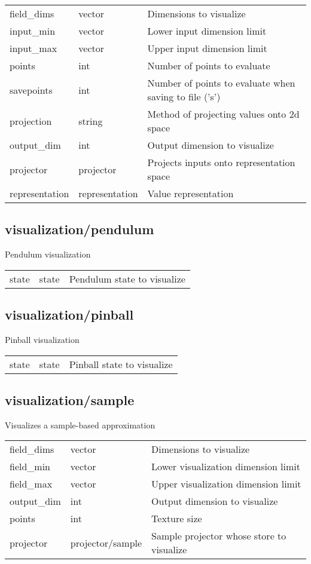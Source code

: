 \noindent\begin{tabular}{@{}lll@{}}
field\_dims&vector&Dimensions to visualize\\
input\_min&vector&Lower input dimension limit\\
input\_max&vector&Upper input dimension limit\\
points&int&Number of points to evaluate\\
savepoints&int&Number of points to evaluate when saving to file ('s')\\
projection&string&Method of projecting values onto 2d space\\
output\_dim&int&Output dimension to visualize\\
projector&projector&Projects inputs onto representation space\\
representation&representation&Value representation\\
\end{tabular}
\subsection{visualization/pendulum}
\noindent Pendulum visualization\\

\noindent\begin{tabular}{@{}lll@{}}
state&state&Pendulum state to visualize\\
\end{tabular}
\subsection{visualization/pinball}
\noindent Pinball visualization\\

\noindent\begin{tabular}{@{}lll@{}}
state&state&Pinball state to visualize\\
\end{tabular}
\subsection{visualization/sample}
\noindent Visualizes a sample-based approximation\\

\noindent\begin{tabular}{@{}lll@{}}
field\_dims&vector&Dimensions to visualize\\
field\_min&vector&Lower visualization dimension limit\\
field\_max&vector&Upper visualization dimension limit\\
output\_dim&int&Output dimension to visualize\\
points&int&Texture size\\
projector&projector/sample&Sample projector whose store to visualize\\
\end{tabular}
